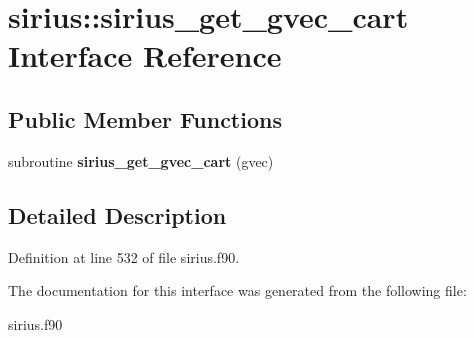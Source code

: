 \hypertarget{interfacesirius_1_1sirius__get__gvec__cart}{}\section{sirius\+:\+:sirius\+\_\+get\+\_\+gvec\+\_\+cart Interface Reference}
\label{interfacesirius_1_1sirius__get__gvec__cart}
\subsection*{Public Member Functions}
\begin{DoxyCompactItemize}
\item 
\hypertarget{interfacesirius_1_1sirius__get__gvec__cart_a94c2a1c9259154457db32b72ba7a424d}{}subroutine {\bfseries sirius\+\_\+get\+\_\+gvec\+\_\+cart} (gvec)\label{interfacesirius_1_1sirius__get__gvec__cart_a94c2a1c9259154457db32b72ba7a424d}

\end{DoxyCompactItemize}


\subsection{Detailed Description}


Definition at line 532 of file sirius.\+f90.



The documentation for this interface was generated from the following file\+:\begin{DoxyCompactItemize}
\item 
sirius.\+f90\end{DoxyCompactItemize}
